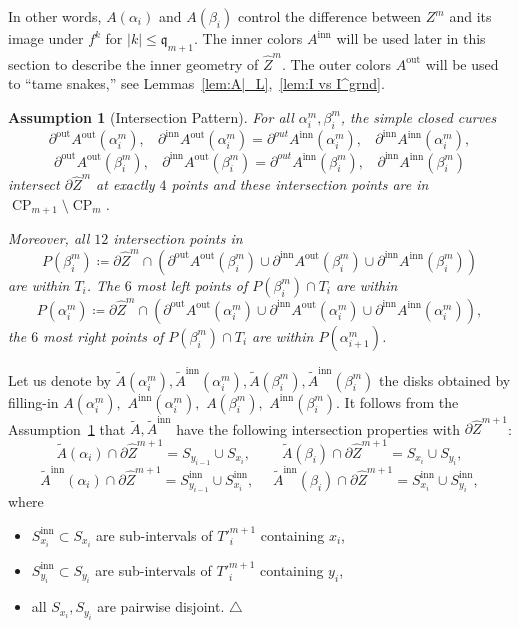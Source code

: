 \documentclass{amsart}
\newcommand\xqed[1]{%
  \leavevmode\unskip\penalty9999 \hbox{}\nobreak\hfill
  \quad\hbox{#1}}
\newcommand\tqed{\xqed{$\triangle$}}
\renewcommand{\sp}{{\ \ }}
\newcommand{\1}{{\mathbb 1 }}
\newcommand{\wZ}{{\widehat Z}}
\newcommand{\qq}{\mathfrak{q}}
\newcommand\inn{{\operatorname{inn}}}
\newcommand\out{{\operatorname{out}}}
\newtheorem{assum}{Assumption}
\theoremstyle{remark}
\numberwithin{equation}{section}
\theoremstyle{definition}
\newcommand{\CP}{{\operatorname{CP}}}
\begin{document}
In other words, $A(\alpha_i)$ and $A(\beta_i)$ control the difference between $Z^m$ and its image under $f^k$ for $|k|\le \qq_{m+1}$. The inner colors $A^\inn$ will be used later in this section to describe the inner geometry of $\wZ^m$. The outer colors $A^\out$ will be used to ``tame snakes,'' see Lemmas~\ref{lem:A|_L},~\ref{lem:I vs I^grnd}.


\begin{assum}[Intersection Pattern]
\label{ass:wZ:int patt}
For all $\alpha^m_i, \beta^m_i$, the simple closed curves
\[ \partial^\out A^\out(\alpha^m_i),\sp\sp \partial^\inn A^\out(\alpha^m_i)=\partial^{out}A^\inn(\alpha^m_i),\sp\sp  \partial^\inn A^\inn(\alpha^m_i), \]
\[ \partial^\out A^\out(\beta^m_i),\sp\sp \partial^\inn A^\out(\beta^m_i)=\partial^{out}A^\inn(\beta^m_i),\sp\sp  \partial^\inn A^\inn(\beta^m_i) \]
intersect $\partial \wZ^m$ at exactly $4$ points and these intersection points are in $\CP_{m+1}\setminus \CP_m$.


Moreover, all $12$ intersection points in \[ P(\beta^m_i)\coloneqq \partial \wZ^m \cap  \left(\partial^\out A^\out(\beta^m_i)\cup \partial^\inn A^\out(\beta^m_i) \cup  \partial^\inn A^\inn(\beta^m_i )\right) \]
are within $T_i$. The $6$ most left points of $P(\beta^m_i)\cap T_i$ are within 
\[ P(\alpha^m_{i})\coloneqq \partial \wZ^m \cap  \left(\partial^\out A^\out(\alpha^m_{i})\cup \partial^\inn A^\out(\alpha^m_{i}) \cup  \partial^\inn A^\inn(\alpha^m_{i} )\right) ,\]
the $6$ most right points of $P(\beta^m_i)\cap T_i$ are within $P(\alpha^m_{i+1})$.
\end{assum}


Let us denote by $\widetilde A(\alpha^m_i), \widetilde A^\inn(\alpha^m_i),\widetilde A(\beta^m_i), \widetilde A^\inn(\beta^m_i)$ the disks obtained by filling-in $A(\alpha^m_i),$ $A^\inn(\alpha^m_i), $ $A(\beta^m_i), $ $A^\inn(\beta^m_i)$. It follows from the Assumption~\ref{ass:wZ:int patt} that $\widetilde A, \widetilde A^\inn$ have the following intersection properties with $\partial \widehat Z^{m+1}$:
\[\widetilde A(\alpha_i)\cap \partial \widehat Z^{m+1} = S_{y_{i-1}} \cup S_{x_{i}},\sp\sp\sp\sp\sp\widetilde A(\beta_i)\cap \partial \widehat Z^{m+1} = S_{x_{i}} \cup S_{y_{i}},\]
\[\widetilde A^\inn(\alpha_i)\cap \partial \widehat Z^{m+1} = S^\inn_{y_{i-1}} \cup S^\inn_{x_{i}},\sp\sp\sp\widetilde A^\inn(\beta_i)\cap \partial \widehat Z^{m+1} = S^\inn_{x_{i}} \cup S^\inn_{y_{i}},\]
where
\begin{itemize}
\item $S^\inn_{x_i}\subset S_{x_i}$ are sub-intervals of $T'^{m+1}_i$ containing $x_i$,
\item $S^\inn_{y_i}\subset S_{y_i}$ are sub-intervals of $T'^{m+1}_i$ containing $y_i$,
\item all $S_{x_i},S_{y_i}$ are pairwise disjoint.\tqed
\end{itemize}
\end{document}
